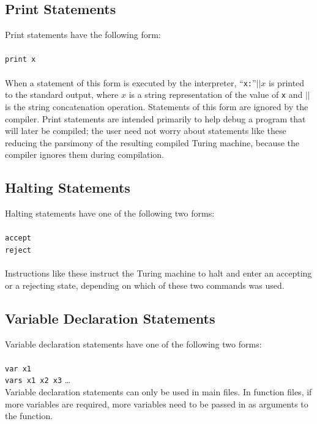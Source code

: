 \subsection{Print Statements}

Print statements have the following form: \\ \\ 
\texttt{print x} \\ \\ 
When a statement of this form is executed by the interpreter, ``\texttt{x:}''$|| x$ is printed to the standard output, where $x$ is a string representation of the value of \texttt{x} and $||$ is the string concatenation operation. Statements of this form are ignored by the compiler. Print statements are intended primarily to help debug a program that will later be compiled; the user need not worry about statements like these reducing the parsimony of the resulting compiled Turing machine, because the compiler ignores them during compilation.

\subsection{Halting Statements}

Halting statements have one of the following two forms: \\ \\
\texttt{accept} \\
\texttt{reject} \\ \\

Instructions like these instruct the Turing machine to halt and enter an accepting or a rejecting state, depending on which of these two commands was used. 

\subsection{Variable Declaration Statements}

Variable declaration statements have one of the following two forms: \\ \\
\texttt{var x1} \\
\texttt{vars x1 x2 x3} \dots \\

Variable declaration statements can only be used in main files. In function files, if more variables are required, more variables need to be passed in as arguments to the function. \\

